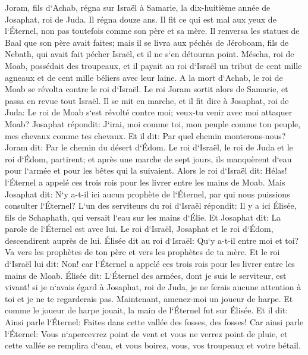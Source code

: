 \verse Joram, fils d`Achab, régna sur Israël à Samarie, la dix-huitième année de Josaphat, roi de Juda. Il régna douze ans. 
\verse Il fit ce qui est mal aux yeux de l`Éternel, non pas toutefois comme son père et sa mère. Il renversa les statues de Baal que son père avait faites; 
\verse mais il se livra aux péchés de Jéroboam, fils de Nebath, qui avait fait pécher Israël, et il ne s`en détourna point. 
\verse Méscha, roi de Moab, possédait des troupeaux, et il payait au roi d`Israël un tribut de cent mille agneaux et de cent mille béliers avec leur laine. 
\verse A la mort d`Achab, le roi de Moab se révolta contre le roi d`Israël. 
\verse Le roi Joram sortit alors de Samarie, et passa en revue tout Israël. 
\verse Il se mit en marche, et il fit dire à Josaphat, roi de Juda: Le roi de Moab s`est révolté contre moi; veux-tu venir avec moi attaquer Moab? Josaphat répondit: J`irai, moi comme toi, mon peuple comme ton peuple, mes chevaux comme tes chevaux. 
\verse Et il dit: Par quel chemin monterons-nous? Joram dit: Par le chemin du désert d`Édom. 
\verse Le roi d`Israël, le roi de Juda et le roi d`Édom, partirent; et après une marche de sept jours, ils manquèrent d`eau pour l`armée et pour les bêtes qui la suivaient. 
\verse Alors le roi d`Israël dit: Hélas! l`Éternel a appelé ces trois rois pour les livrer entre les mains de Moab. 
\verse Mais Josaphat dit: N`y a-t-il ici aucun prophète de l`Éternel, par qui nous puissions consulter l`Éternel? L`un des serviteurs du roi d`Israël répondit: Il y a ici Élisée, fils de Schaphath, qui versait l`eau sur les mains d`Élie. 
\verse Et Josaphat dit: La parole de l`Éternel est avec lui. Le roi d`Israël, Josaphat et le roi d`Édom, descendirent auprès de lui. 
\verse Élisée dit au roi d`Israël: Qu`y a-t-il entre moi et toi? Va vers les prophètes de ton père et vers les prophètes de ta mère. Et le roi d`Israël lui dit: Non! car l`Éternel a appelé ces trois rois pour les livrer entre les mains de Moab. 
\verse Élisée dit: L`Éternel des armées, dont je suis le serviteur, est vivant! si je n`avais égard à Josaphat, roi de Juda, je ne ferais aucune attention à toi et je ne te regarderais pas. 
\verse Maintenant, amenez-moi un joueur de harpe. Et comme le joueur de harpe jouait, la main de l`Éternel fut sur Élisée. 
\verse Et il dit: Ainsi parle l`Éternel: Faites dans cette vallée des fosses, des fosses! 
\verse Car ainsi parle l`Éternel: Vous n`apercevrez point de vent et vous ne verrez point de pluie, et cette vallée se remplira d`eau, et vous boirez, vous, vos troupeaux et votre bétail. 

